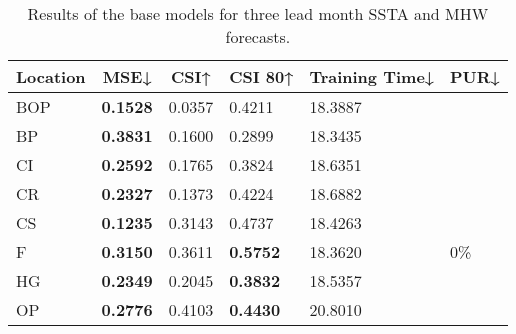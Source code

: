 \documentclass[11pt, a4paper]{article}
\begin{document}
\begin{table}[H]
\centering
\small
\caption{Results of the base models for three lead month SSTA and MHW forecasts.}
\begin{tabular}{llllll}
\multicolumn{1}{c}{\textbf{Location}} & \multicolumn{1}{c}{\textbf{MSE↓}} & \multicolumn{1}{c}{\textbf{CSI↑}} & \multicolumn{1}{c}{\textbf{CSI 80↑}} & \multicolumn{1}{c}{\textbf{Training Time↓}} & \multicolumn{1}{c}{\textbf{PUR↓}} \\ \hline
BOP                         & \textbf{0.1528}                   & 0.0357                            & 0.4211                               & 18.3887                                     &                                   \\
BP                        & \textbf{0.3831}                   & 0.1600                            & 0.2899                               & 18.3435                                     &                                   \\
CI                        & \textbf{0.2592}                   & 0.1765                            & 0.3824                               & 18.6351                                     &                                   \\
CR                           & \textbf{0.2327}                   & 0.1373                            & 0.4224                               & 18.6882                                     &                                   \\
CS                           & \textbf{0.1235}                   & 0.3143                            & 0.4737                               & 18.4263                                     &                                   \\
F                             & \textbf{0.3150}                   & 0.3611                            & \textbf{0.5752}                      & 18.3620                                     & 0\%                               \\
HG                          & \textbf{0.2349}                   & 0.2045                            & \textbf{0.3832}                      & 18.5357                                     &                                   \\
OP                       & \textbf{0.2776}                   & 0.4103                            & \textbf{0.4430}                      & 20.8010                                     &                                   \\

\end{tabular}
\end{table}
\end{document}

